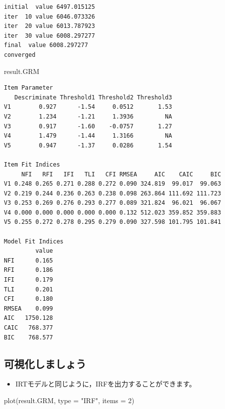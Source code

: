 \documentclass[
  a4paper,
]{ltjsbook}
\newenvironment{Shaded}{\begin{snugshade}}{\end{snugshade}}
\newcommand{\AttributeTok}[1]{\textcolor[rgb]{0.40,0.45,0.13}{#1}}
\newcommand{\DecValTok}[1]{\textcolor[rgb]{0.68,0.00,0.00}{#1}}
\newcommand{\FunctionTok}[1]{\textcolor[rgb]{0.28,0.35,0.67}{#1}}
\newcommand{\NormalTok}[1]{\textcolor[rgb]{0.00,0.23,0.31}{#1}}
\newcommand{\StringTok}[1]{\textcolor[rgb]{0.13,0.47,0.30}{#1}}
\providecommand{\tightlist}{%
  \setlength{\itemsep}{0pt}\setlength{\parskip}{0pt}}\usepackage{longtable,booktabs,array}
\begin{document}
\begin{verbatim}
initial  value 6497.015125 
iter  10 value 6046.073326
iter  20 value 6013.787923
iter  30 value 6008.297277
final  value 6008.297277 
converged
\end{verbatim}

\begin{Shaded}
\begin{Highlighting}[]
\NormalTok{result.GRM}
\end{Highlighting}
\end{Shaded}

\begin{verbatim}
Item Parameter
   Descriminate Threshold1 Threshold2 Threshold3
V1        0.927      -1.54     0.0512       1.53
V2        1.234      -1.21     1.3936         NA
V3        0.917      -1.60    -0.0757       1.27
V4        1.479      -1.44     1.3166         NA
V5        0.947      -1.37     0.0286       1.54

Item Fit Indices
     NFI   RFI   IFI   TLI   CFI RMSEA     AIC    CAIC     BIC
V1 0.248 0.265 0.271 0.288 0.272 0.090 324.819  99.017  99.063
V2 0.219 0.244 0.236 0.263 0.238 0.098 263.864 111.692 111.723
V3 0.253 0.269 0.276 0.293 0.277 0.089 321.824  96.021  96.067
V4 0.000 0.000 0.000 0.000 0.000 0.132 512.023 359.852 359.883
V5 0.255 0.272 0.278 0.295 0.279 0.090 327.598 101.795 101.841

Model Fit Indices
         value
NFI      0.165
RFI      0.186
IFI      0.179
TLI      0.201
CFI      0.180
RMSEA    0.099
AIC   1750.128
CAIC   768.377
BIC    768.577
\end{verbatim}

\subsection{可視化しましょう}\label{ux53efux8996ux5316ux3057ux307eux3057ux3087ux3046-1}

\begin{itemize}
\tightlist
\item
  IRTモデルと同じように，IRFを出力することができます。
\end{itemize}

\begin{Shaded}
\begin{Highlighting}[]
\FunctionTok{plot}\NormalTok{(result.GRM, }\AttributeTok{type =} \StringTok{"IRF"}\NormalTok{, }\AttributeTok{items =} \DecValTok{2}\NormalTok{)}
\end{Highlighting}
\end{Shaded}
\end{document}
